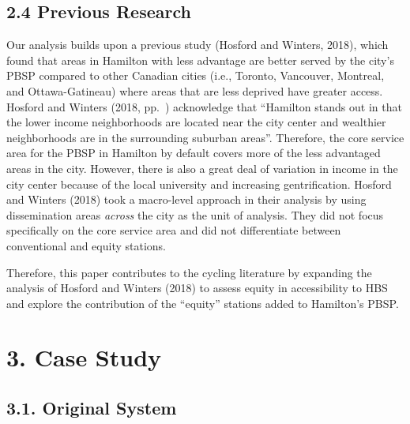 \documentclass[]{elsarticle} %
\begin{document}
\hypertarget{previous-research}{%
\subsection{2.4 Previous Research}\label{previous-research}}

Our analysis builds upon a previous study (Hosford and Winters, 2018),
which found that areas in Hamilton with less advantage are better served
by the city's PBSP compared to other Canadian cities (i.e., Toronto,
Vancouver, Montreal, and Ottawa-Gatineau) where areas that are less
deprived have greater access. Hosford and Winters (2018, pp.~)
acknowledge that ``Hamilton stands out in that the lower income
neighborhoods are located near the city center and wealthier
neighborhoods are in the surrounding suburban areas''. Therefore, the
core service area for the PBSP in Hamilton by default covers more of the
less advantaged areas in the city. However, there is also a great deal
of variation in income in the city center because of the local
university and increasing gentrification. Hosford and Winters (2018)
took a macro-level approach in their analysis by using dissemination
areas \emph{across} the city as the unit of analysis. They did not focus
specifically on the core service area and did not differentiate between
conventional and equity stations.

Therefore, this paper contributes to the cycling literature by expanding
the analysis of Hosford and Winters (2018) to assess equity in
accessibility to HBS and explore the contribution of the ``equity''
stations added to Hamilton's PBSP.

\hypertarget{sec:study}{%
\section{3. Case Study}\label{sec:study}}

\hypertarget{original-system}{%
\subsection{3.1. Original System}\label{original-system}}
\end{document}
